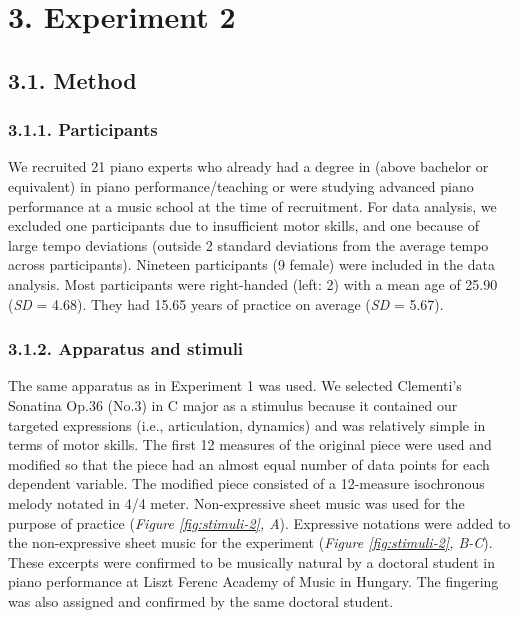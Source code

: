 \documentclass[
  english,
  man,floatsintext]{apa6}
\begin{document}
\newpage

\hypertarget{experiment-2}{%
\section{3. Experiment 2}\label{experiment-2}}

\hypertarget{method-1}{%
\subsection{3.1. Method}\label{method-1}}

\hypertarget{participants-1}{%
\subsubsection{3.1.1. Participants}\label{participants-1}}

We recruited 21 piano experts who already had a degree in (above bachelor or equivalent) in piano performance/teaching or were studying advanced piano performance at a music school at the time of recruitment. For data analysis, we excluded one participants due to insufficient motor skills, and one because of large tempo deviations (outside 2 standard deviations from the average tempo across participants). Nineteen participants (9 female) were included in the data analysis. Most participants were right-handed (left: 2) with a mean age of 25.90 (\emph{SD} = 4.68). They had 15.65 years of practice on average (\emph{SD} = 5.67).

\hypertarget{apparatus-and-stimuli-1}{%
\subsubsection{3.1.2. Apparatus and stimuli}\label{apparatus-and-stimuli-1}}

The same apparatus as in Experiment 1 was used. We selected Clementi's Sonatina Op.36 (No.3) in C major as a stimulus because it contained our targeted expressions (i.e., articulation, dynamics) and was relatively simple in terms of motor skills. The first 12 measures of the original piece were used and modified so that the piece had an almost equal number of data points for each dependent variable. The modified piece consisted of a 12-measure isochronous melody notated in 4/4 meter. Non-expressive sheet music was used for the purpose of practice (\emph{Figure \ref{fig:stimuli-2}, A}). Expressive notations were added to the non-expressive sheet music for the experiment (\emph{Figure \ref{fig:stimuli-2}, B-C}). These excerpts were confirmed to be musically natural by a doctoral student in piano performance at Liszt Ferenc Academy of Music in Hungary. The fingering was also assigned and confirmed by the same doctoral student.
\end{document}
